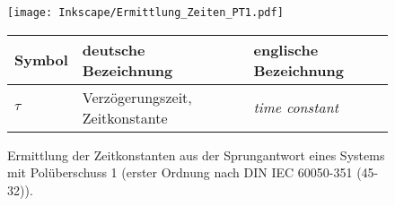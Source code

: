 \begin{figure}[hbtp]
    \begin{center}
        \texttt{[image: Inkscape/Ermittlung\_Zeiten\_PT1.pdf]}
        \vspace{2ex}
        \begin{small}
            \begin{tabular}{|l|p{6.4cm}|p{6.4cm}|}\hline
                \rowcolor{lightgray}\textbf{Symbol} & \textbf{deutsche Bezeichnung}   & \textbf{englische Bezeichnung} \\
                \hline
                $\tau$                              & Verzögerungszeit, Zeitkonstante & \textit{time constant}         \\
                \hline
            \end{tabular}
        \end{small}
    \end{center}
    \caption{Ermittlung der Zeitkonstanten aus der Sprungantwort eines Systems mit Polüberschuss 1 (erster Ordnung nach DIN IEC 60050-351 (45-32)).}
    \label{fig:ermittlung_zeitkonstante}
\end{figure}


